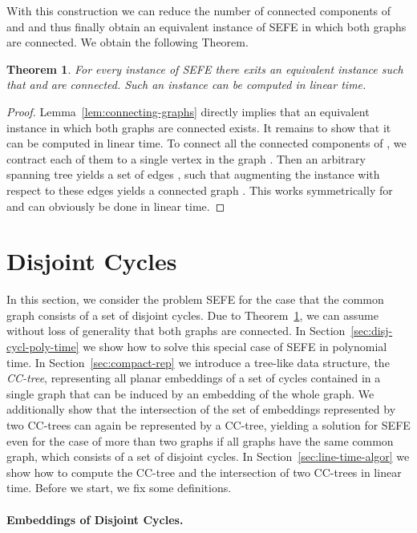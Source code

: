 \documentclass{scrartcl}
\newcommand{\1}[1]{{\normalfont \ensuremath{#1^{\tiny\circled{1}}}}} \newcommand{\2}[1]{{\normalfont \ensuremath{#1^{\tiny\circled{2}}}}} \renewcommand{\k}[1]{{\normalfont \ensuremath{#1^{\tiny\circled{k}}}}} \newcommand{\proj}[2]{\ensuremath{\left.#1\right|_{#2}}} \newcommand{\eps}{\varepsilon}
\theoremstyle{plain} \newtheorem{theorem}{Theorem} \newcounter{lemmacounter} \setcounter{lemmacounter}{0} \newtheorem{lemma}[lemmacounter]{Lemma} \newtheorem{fact}{Fact}  \newtheorem{corollary}{Corollary} \theoremstyle{definition} \newtheorem{definition}{Definition}
\begin{document}
With this construction we can reduce the number of connected
components of  and  and thus finally obtain an equivalent
instance of {\sc SEFE} in which both graphs are connected.  We obtain
the following Theorem.

\begin{theorem}
  \label{thm:connecting-graphs}
  For every instance  of {\sc SEFE} there exits an
  equivalent instance  such that
   and  are connected.  Such an instance can
  be computed in linear time.
\end{theorem}
\begin{proof}
  Lemma~\ref{lem:connecting-graphs} directly implies that an
  equivalent instance  in which both graphs
  are connected exists.  It remains to show that it can be computed in
  linear time.  To connect all the connected components of , we
  contract each of them to a single vertex in the graph .  Then
  an arbitrary spanning tree yields a set of edges , such that augmenting the instance with
  respect to these edges yields a connected graph .  This
  works symmetrically for  and can obviously be done in linear
  time.
\end{proof}

\section{Disjoint Cycles}
\label{sec:disj-cycl}

In this section, we consider the problem {\sc SEFE} for the case that
the common graph consists of a set of disjoint cycles.  Due to
Theorem~\ref{thm:connecting-graphs}, we can assume without loss of
generality that both graphs are connected.  In
Section~\ref{sec:disj-cycl-poly-time} we show how to solve this
special case of {\sc SEFE} in polynomial time.  In
Section~\ref{sec:compact-rep} we introduce a tree-like data structure,
the \emph{CC-tree}, representing all planar embeddings of a set of
cycles contained in a single graph that can be induced by an embedding
of the whole graph.  We additionally show that the intersection of the
set of embeddings represented by two CC-trees can again be represented
by a CC-tree, yielding a solution for {\sc SEFE} even for the case of
more than two graphs if all graphs have the same common graph, which
consists of a set of disjoint cycles.  In
Section~\ref{sec:line-time-algor} we show how to compute the CC-tree
and the intersection of two CC-trees in linear time.  Before we start,
we fix some definitions.

\paragraph{Embeddings of Disjoint Cycles.}
\label{sec:embedd-disj-cycl}
\end{document}
